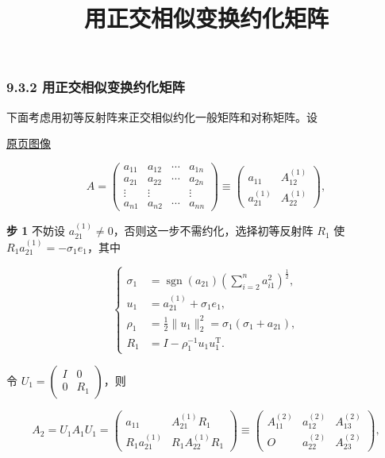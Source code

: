 \documentclass[
  10pt,
  fontset=fandol]{ctexart}
\title{用正交相似变换约化矩阵}
\author{}
\date{}
\begin{document}
\maketitle

\subsubsection{9.3.2 用正交相似变换约化矩阵}\label{ux7528ux6b63ux4ea4ux76f8ux4f3cux53d8ux6362ux7ea6ux5316ux77e9ux9635}

下面考虑用初等反射阵来正交相似约化一般矩阵和对称矩阵。设

\href{../../source-images/pdf-246.jpeg}{原页图像}

\[
A=\left(\begin{array}{c|ccc}
a_{11}&a_{12}&\cdots&a_{1n}\\\hline
a_{21}&a_{22}&\cdots&a_{2n}\\
\vdots&\vdots&&\vdots\\
a_{n1}&a_{n2}&\cdots&a_{nn}
\end{array}\right)
\equiv\begin{pmatrix}
a_{11}&A_{12}^{(1)}\\
a_{21}^{(1)}&A_{22}^{(1)}
\end{pmatrix},
\]

\textbf{步 1} 不妨设 \(a_{21}^{(1)}\ne0\)，否则这一步不需约化，选择初等反射阵 \(R_1\) 使 \(R_1a_{21}^{(1)}=-\sigma_1e_1\)，其中

\[
\left\{
\begin{aligned}
\sigma_1&=\operatorname{sgn}(a_{21})\left(\sum_{i=2}^na_{i1}^2\right)^{\frac12},\\
u_1&=a_{21}^{(1)}+\sigma_1e_1,\\
\rho_1&=\frac12\|u_1\|_2^2=\sigma_1(\sigma_1+a_{21}),\\
R_1&=I-\rho_1^{-1}u_1u_1^{\mathrm T}.
\end{aligned}
\right.
\tag{9.3.1}
\]

令 \(U_1=\begin{pmatrix}I&0\\0&R_1\end{pmatrix}\)，则

\[
A_2=U_1A_1U_1=\begin{pmatrix}
a_{11}&A_{21}^{(1)}R_1\\
R_1a_{21}^{(1)}&R_1A_{22}^{(1)}R_1
\end{pmatrix}
\equiv\begin{pmatrix}
A_{11}^{(2)}&a_{12}^{(2)}&A_{13}^{(2)}\\
O&a_{22}^{(2)}&A_{23}^{(2)}
\end{pmatrix},
\]
\end{document}
